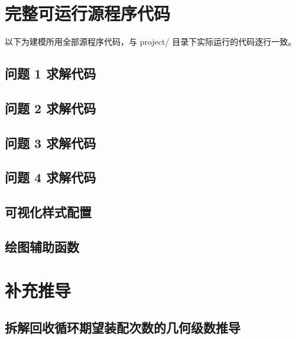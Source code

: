 \documentclass[12pt,a4paper]{ctexart}
\begin{document}
\section{完整可运行源程序代码}

以下为建模所用全部源程序代码，与 project/ 目录下实际运行的代码逐行一致。

\subsection{问题 1 求解代码}


\subsection{问题 2 求解代码}


\subsection{问题 3 求解代码}


\subsection{问题 4 求解代码}


\subsection{可视化样式配置}


\subsection{绘图辅助函数}


\section{补充推导}

\subsection{拆解回收循环期望装配次数的几何级数推导}
\end{document}
